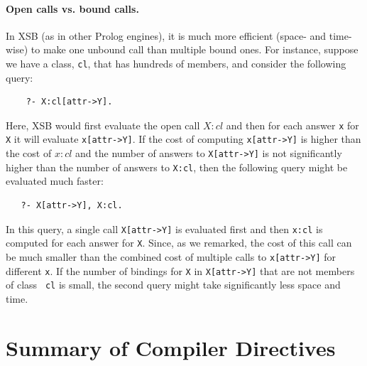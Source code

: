\documentclass[11pt]{article}
\begin{document}
\paragraph{Open calls vs. bound calls.}
In XSB (as in other Prolog engines), it is much more efficient (space- and
time-wise) to make one unbound call than multiple bound ones. For instance,
suppose we have a class, {\tt cl}, that has hundreds of members, and
consider the following query:
\begin{verbatim}
    ?- X:cl[attr->Y].  
\end{verbatim}
Here, XSB would first evaluate the open call $X:cl$ and then for each
answer {\tt x} for {\tt X} it will evaluate {\tt x[attr->Y]}.
If the cost of computing {\tt x[attr->Y]} is higher than the cost of $x:cl$
and the number of answers to {\tt X[attr->Y]} is not significantly
higher than the number of answers to {\tt X:cl}, then the following query
might be evaluated much faster:
\begin{verbatim}
   ?- X[attr->Y], X:cl.  
\end{verbatim}
In this query, a single call {\tt X[attr->Y]} is evaluated first and then
{\tt x:cl} is computed for each answer for {\tt X}.  Since, as we remarked,
the cost of this call can be much smaller than the combined cost of
multiple calls to {\tt x[attr->Y]} for different {\tt x}.  If the number of
bindings for {\tt X} in {\tt X[attr->Y]} that are not members of class {\tt
  cl} is small, the second query might take significantly less space and
time.


\section{Summary of Compiler Directives} \label{sec-comp-directives}
\end{document}
